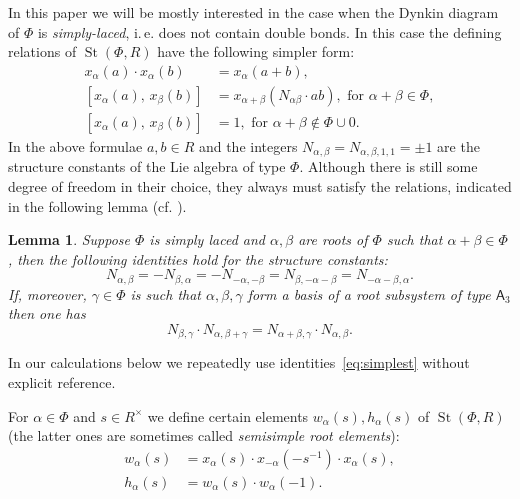 \documentclass[10pt,a4paper,twoside]{article}
\newtheorem{lemma}{Lemma}
\theoremstyle{remark}
\theoremstyle{definition}
\numberwithin{lemma}{section}
\numberwithin{prop}{section}
\numberwithin{corollary}{section}
\numberwithin{externaltheorem}{section}
\DeclareMathOperator{\St}{St}
\newcommand{\rA}{\mathsf{A}}
\numberwithin{equation}{section}
\begin{document}
In this paper we will be mostly interested in the case when the Dynkin diagram of $\Phi$ is {\it simply-laced}, i.\,e. does not contain double bonds. In this case the defining relations of $\St(\Phi, R)$ have the following simpler form:
\begin{align}
x_{\alpha}(a)\cdot x_{\alpha}(b)&=x_{\alpha}(a+b), \tag{R1} \label{Steinberg-additivity}\\
[x_{\alpha}(a),\,x_{\beta}(b)]  &=x_{\alpha+\beta}(N_{\alpha\beta} \cdot ab),\text{ for }\alpha+\beta\in\Phi, \tag{R2} \label{Chevalley-CCF1} \\
[x_{\alpha}(a),\,x_{\beta}(b)]  &=1,\text{ for }\alpha+\beta\not\in\Phi\cup0. \tag{R3} \label{Chevalley-CCF2}
\end{align}
In the above formulae $a, b \in R$ and the integers $N_{\alpha, \beta} = N_{\alpha, \beta, 1, 1} = \pm 1$ are the structure constants of the Lie algebra of type $\Phi$. Although there is still some degree of freedom in their choice, they always must satisfy the relations, indicated in the following lemma (cf. \cite[\S~14]{VP}).
\begin{lemma} Suppose $\Phi$ is simply laced and $\alpha, \beta$ are roots of $\Phi$ such that $\alpha+\beta\in \Phi$, then the following identities hold for the structure constants:
\begin{equation} \label{eq:simplest} N_{\alpha, \beta} = -N_{\beta,\alpha} = - N_{-\alpha, -\beta} = N_{\beta, -\alpha-\beta} = N_{-\alpha-\beta, \alpha}. \end{equation}
If, moreover, $\gamma \in \Phi$ is such that $\alpha,\beta,\gamma$ form a basis of a root subsystem of type $\rA_3$ then one has
\begin{equation} \label{eq:cocycle} N_{\beta,\gamma} \cdot N_{\alpha, \beta+\gamma} = N_{\alpha+\beta, \gamma} \cdot N_{\alpha, \beta}. \end{equation} \end{lemma}
In our calculations below we repeatedly use identities~\eqref{eq:simplest} without explicit reference.

For $\alpha\in\Phi$ and $s \in R^\times$ we define certain elements $w_\alpha(s), h_\alpha(s)$ of $\St(\Phi, R)$ (the latter ones are sometimes called {\it semisimple root elements}):
\begin{align*} w_\alpha(s) & =  x_\alpha(s) \cdot x_{-\alpha}(-s^{-1}) \cdot x_\alpha(s), \\ h_\alpha(s) & =  w_\alpha(s) \cdot w_\alpha(-1).  \end{align*}
\end{document}
